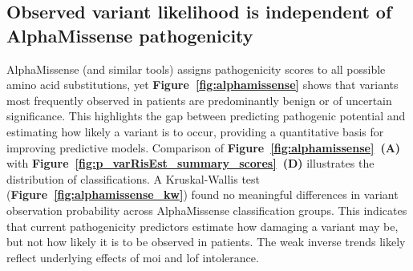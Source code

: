 \FloatBarrier

\subsection{Observed variant likelihood is independent of AlphaMissense pathogenicity}
AlphaMissense (and similar tools) assigns pathogenicity scores to all possible amino acid substitutions, yet \textbf{Figure~\ref{fig:alphamissense}} shows that variants most frequently observed in patients are predominantly benign or of uncertain significance. This highlights the gap between predicting pathogenic potential and estimating how likely a variant is to occur, providing a quantitative basis for improving predictive models.
Comparison of \textbf{Figure~\ref{fig:alphamissense}~(A)} with \textbf{Figure~\ref{fig:p_varRisEst_summary_scores}~(D)} illustrates the distribution of classifications.
A Kruskal-Wallis test (\textbf{Figure~\ref{fig:alphamissense_kw}}) found no meaningful differences in variant observation probability across AlphaMissense classification groups. This indicates that current pathogenicity predictors estimate how damaging a variant may be, but not how likely it is to be observed in patients. The weak inverse trends likely reflect underlying effects of \ac{moi} and \ac{lof} intolerance.

